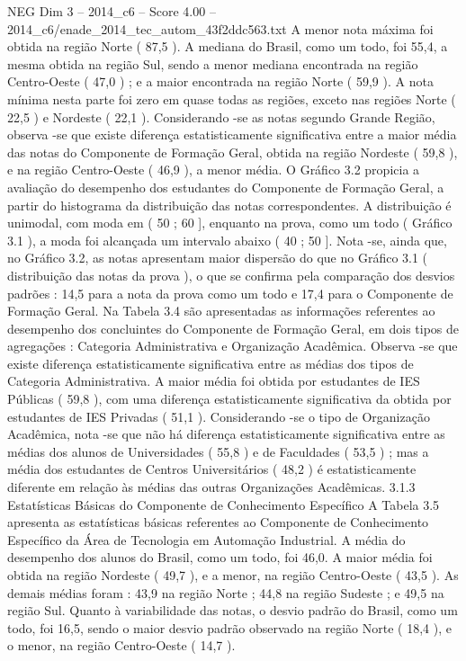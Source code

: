 \begin{textsample}{NEG Dim 3 – 2014\_c6 – Score 4.00 – 2014\_c6/enade\_2014\_tec\_autom\_43f2ddc563.txt}
A menor nota máxima foi obtida na região Norte ( 87,5 ).
A mediana do Brasil, como um todo, foi 55,4, a mesma obtida na região Sul, sendo a menor mediana encontrada na região Centro-Oeste ( 47,0 ) ; e a maior encontrada na região Norte ( 59,9 ).
A nota mínima nesta parte foi zero em quase todas as regiões, exceto nas regiões Norte ( 22,5 ) e Nordeste ( 22,1 ).
Considerando -se as notas segundo Grande Região, observa -se que existe diferença estatisticamente significativa entre a maior média das notas do Componente de Formação Geral, obtida na região Nordeste ( 59,8 ), e na região Centro-Oeste ( 46,9 ), a menor média.
O Gráfico 3.2 propicia a avaliação do desempenho dos estudantes do Componente de Formação Geral, a partir do histograma da distribuição das notas correspondentes.
A distribuição é unimodal, com moda em ( 50 ; 60 ], enquanto na prova, como um todo ( Gráfico 3.1 ), a moda foi alcançada um intervalo abaixo ( 40 ; 50 ].
Nota -se, ainda que, no Gráfico 3.2, as notas apresentam maior dispersão do que no Gráfico 3.1 ( distribuição das notas da prova ), o que se confirma pela comparação dos desvios padrões : 14,5 para a nota da prova como um todo e 17,4 para o Componente de Formação Geral.
Na Tabela 3.4 são apresentadas as informações referentes ao desempenho dos concluintes do Componente de Formação Geral, em dois tipos de agregações : Categoria Administrativa e Organização Acadêmica.
Observa -se que existe diferença estatisticamente significativa entre as médias dos tipos de Categoria Administrativa.
A maior média foi obtida por estudantes de IES Públicas ( 59,8 ), com uma diferença estatisticamente significativa da obtida por estudantes de IES Privadas ( 51,1 ).
Considerando -se o tipo de Organização Acadêmica, nota -se que não há diferença estatisticamente significativa entre as médias dos alunos de Universidades ( 55,8 ) e de Faculdades ( 53,5 ) ; mas a média dos estudantes de Centros Universitários ( 48,2 ) é estatisticamente diferente em relação às médias das outras Organizações Acadêmicas. 3.1.3 Estatísticas Básicas do Componente de Conhecimento Específico A Tabela 3.5 apresenta as estatísticas básicas referentes ao Componente de Conhecimento Específico da Área de Tecnologia em Automação Industrial.
A média do desempenho dos alunos do Brasil, como um todo, foi 46,0.
A maior média foi obtida na região Nordeste ( 49,7 ), e a menor, na região Centro-Oeste ( 43,5 ).
As demais médias foram : 43,9 na região Norte ; 44,8 na região Sudeste ; e 49,5 na região Sul.
Quanto à variabilidade das notas, o desvio padrão do Brasil, como um todo, foi 16,5, sendo o maior desvio padrão observado na região Norte ( 18,4 ), e o menor, na região Centro-Oeste ( 14,7 ).

\end{textsample}
